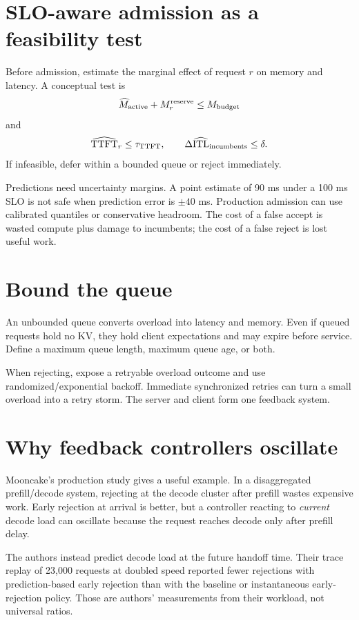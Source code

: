 \section{SLO-aware admission as a feasibility test}

Before admission, estimate the marginal effect of request $r$ on memory and latency.
A conceptual test is
\[
\widehat M_{\rm active}+M_r^{\rm reserve}\le M_{\rm budget}
\]
and
\[
\widehat{\mathrm{TTFT}}_r\le\tau_{\rm TTFT},\qquad
\Delta\widehat{\mathrm{ITL}}_{\rm incumbents}\le\delta.
\]
If infeasible, defer within a bounded queue or reject immediately.

Predictions need uncertainty margins. A point estimate of 90 ms under a 100 ms SLO is
not safe when prediction error is $\pm40$ ms. Production admission can use calibrated
quantiles or conservative headroom. The cost of a false accept is wasted compute plus
damage to incumbents; the cost of a false reject is lost useful work.

\section{Bound the queue}

An unbounded queue converts overload into latency and memory. Even if queued requests
hold no KV, they hold client expectations and may expire before service. Define a
maximum queue length, maximum queue age, or both.

When rejecting, expose a retryable overload outcome and use randomized/exponential
backoff. Immediate synchronized retries can turn a small overload into a retry storm.
The server and client form one feedback system.

\section{Why feedback controllers oscillate}

Mooncake's production study gives a useful example. In a disaggregated prefill/decode
system, rejecting at the decode cluster after prefill wastes expensive work. Early
rejection at arrival is better, but a controller reacting to \emph{current} decode
load can oscillate because the request reaches decode only after prefill delay.

The authors instead predict decode load at the future handoff time. Their trace replay
of 23,000 requests at doubled speed reported fewer rejections with prediction-based
early rejection than with the baseline or instantaneous early-rejection policy.
Those are authors' measurements from their workload, not universal ratios.

